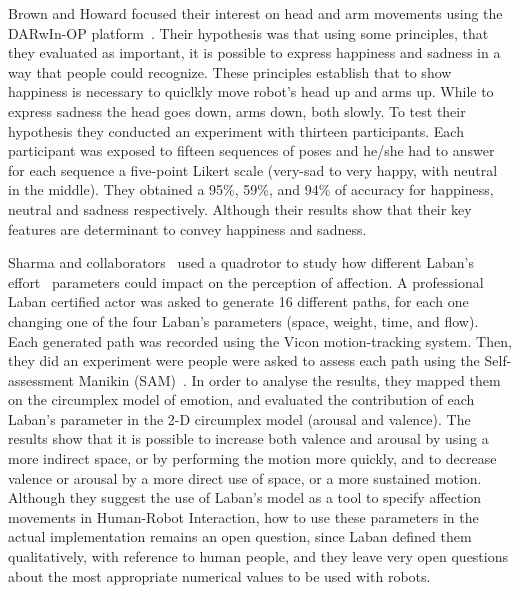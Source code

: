 Brown and Howard focused their interest on head and arm movements using the DARwIn-OP platform~\cite{Brown2014}. Their hypothesis was that using some principles, that they evaluated as important, it is possible to express happiness and sadness in a way that people could recognize. These principles establish that to show happiness is necessary to quiclkly move robot's head up and arms up. While to express sadness the head goes down, arms down, both slowly. To test their hypothesis they conducted an experiment with thirteen participants. Each participant was exposed to fifteen sequences of poses and he/she had to answer for each sequence a five-point Likert scale (very-sad to very happy, with neutral in the middle). They obtained a 95\%, 59\%, and 94\% of accuracy for happiness, neutral and sadness respectively. Although their results show that their key features are determinant to convey happiness and sadness.
 
Sharma and collaborators~\cite{Sharma2013} used a quadrotor to study how different Laban's effort~\cite{Laban1968} parameters could impact on the perception of affection. A professional Laban certified actor was asked to generate 16 different paths, for each one changing one of the four Laban's parameters (space, weight, time, and flow). Each generated path was recorded using the Vicon motion-tracking system. Then, they did an experiment were people were asked to assess each path using the Self-assessment Manikin (SAM)~\cite{Lang2008}. In order to analyse the results, they mapped them on the circumplex model of emotion, and evaluated the contribution of each Laban's parameter in the 2-D circumplex model (arousal and valence). The results show that it is possible to increase both valence and arousal by using a more indirect space, or by performing the motion more quickly, and to decrease valence or arousal by a more direct use of space, or a more sustained motion. 
Although they suggest the use of Laban's model as a tool to specify affection movements in Human-Robot Interaction, how to use these parameters in the actual implementation remains an open question, since Laban defined them qualitatively, with reference to human people, and they leave very open questions about the most appropriate numerical values to be used with robots.

